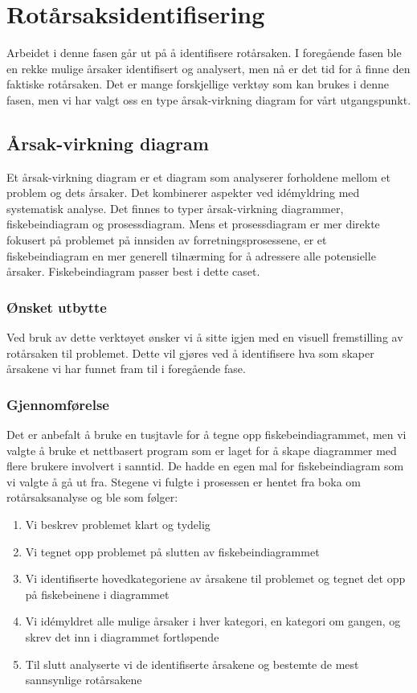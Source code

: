 \chapter{Rotårsaksidentifisering}
Arbeidet i denne fasen går ut på å identifisere rotårsaken. I foregående fasen ble en rekke mulige årsaker identifisert og analysert, men nå er det tid for å finne den faktiske rotårsaken. Det er mange forskjellige verktøy som kan brukes i denne fasen, men vi har valgt oss en type årsak-virkning diagram for vårt utgangspunkt.

\section{Årsak-virkning diagram}
Et årsak-virkning diagram er et diagram som analyserer forholdene mellom et problem og dets årsaker. Det kombinerer aspekter ved idémyldring med systematisk analyse. Det finnes to typer årsak-virkning diagrammer, fiskebeindiagram og prosessdiagram. Mens et prosessdiagram er mer direkte fokusert på problemet på innsiden av forretningsprosessene, er et fiskebeindiagram en mer generell tilnærming for å adressere alle potensielle årsaker\cite{RCA}. Fiskebeindiagram passer best i dette caset.

\subsection{Ønsket utbytte}
Ved bruk av dette verktøyet ønsker vi å sitte igjen med en visuell fremstilling av rotårsaken til problemet. Dette vil gjøres ved å identifisere hva som skaper årsakene vi har funnet fram til i foregående fase.

\subsection{Gjennomførelse}
Det er anbefalt å bruke en tusjtavle for å tegne opp fiskebeindiagrammet, men vi valgte å bruke et nettbasert program som er laget for å skape diagrammer med flere brukere involvert i sanntid. De hadde en egen mal for fiskebeindiagram som vi valgte å gå ut fra. Stegene vi fulgte i prosessen er hentet fra boka om rotårsaksanalyse \cite{RCA} og ble som følger:
\begin{enumerate}
    \item Vi beskrev problemet klart og tydelig
    \item Vi tegnet opp problemet på slutten av fiskebeindiagrammet
    \item Vi identifiserte hovedkategoriene av årsakene til problemet og tegnet det opp på fiskebeinene i diagrammet
    \item Vi idémyldret alle mulige årsaker i hver kategori, en kategori om gangen, og skrev det inn i diagrammet fortløpende
    \item Til slutt analyserte vi de identifiserte årsakene og bestemte de mest sannsynlige rotårsakene
\end{enumerate}

